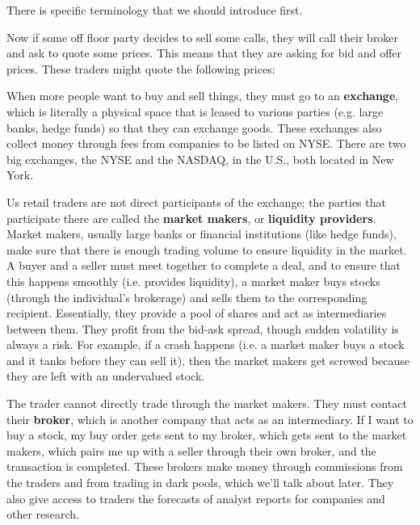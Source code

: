 \documentclass{article}
\begin{document}
    There is specific terminology that we should introduce first. 

    \begin{definition}
      
    \end{definition}
    Now if some off floor party decides to sell some calls, they will call their broker and ask to quote some prices. This means that they are asking for bid and offer prices. These traders might quote the following prices: 



    When more people want to buy and sell things, they must go to an \textbf{exchange}, which is literally a physical space that is leased to various parties (e.g. large banks, hedge funds) so that they can exchange goods. These exchanges also collect money through fees from companies to be listed on NYSE. There are two big exchanges, the NYSE and the NASDAQ, in the U.S., both located in New York. 

    Us retail traders are not direct participants of the exchange; the parties that participate there are called the \textbf{market makers}, or \textbf{liquidity providers}. Market makers, usually large banks or financial institutions (like hedge funds), make sure that there is enough trading volume to ensure liquidity in the market. A buyer and a seller must meet together to complete a deal, and to ensure that this happens smoothly (i.e. provides liquidity), a market maker buys stocks (through the individual's brokerage) and sells them to the corresponding recipient. Essentially, they provide a pool of shares and act as intermediaries between them. They profit from the bid-ask spread, though sudden volatility is always a risk. For example, if a crash happens (i.e. a market maker buys a stock and it tanks before they can sell it), then the market makers get screwed because they are left with an undervalued stock. 

    The trader cannot directly trade through the market makers. They must contact their \textbf{broker}, which is another company that acts as an intermediary. If I want to buy a stock, my buy order gets sent to my broker, which gets sent to the market makers, which pairs me up with a seller through their own broker, and the transaction is completed. These brokers make money through commissions from the traders and from trading in dark pools, which we'll talk about later. They also give access to traders the forecasts of analyst reports for companies and other research. 
\end{document}
